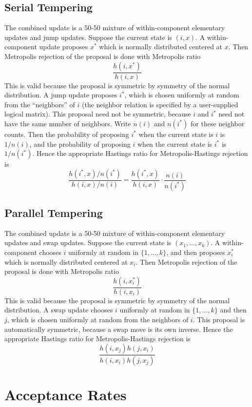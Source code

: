 \documentclass[11pt]{article}
\begin{document}
\subsection{Serial Tempering}

The combined update is a 50-50 mixture of within-component elementary updates
and jump updates.  Suppose the current state is $(i, x)$.  A within-component
update proposes $x^*$ which is normally distributed centered at $x$.  Then
Metropolis rejection of the proposal is done with Metropolis ratio
$$
   \frac{h(i, x^*)}{h(i, x)}
$$
This is valid because the proposal is symmetric by symmetry of the normal
distribution.  A jump update proposes $i^*$, which is chosen uniformly at
random from the ``neighbors'' of $i$ (the neighbor relation is specified
by a user-supplied logical matrix).  This proposal need not be symmetric,
because $i$ and $i^*$ need not have the same number of neighbors.  Write
$n(i)$ and $n(i^*)$ for these neighbor counts.  Then the probability of
proposing $i^*$ when the current state is $i$ is $1 / n(i)$, and the
probability of
proposing $i$ when the current state is $i^*$ is $1 / n(i^*)$.  Hence
the appropriate Hastings ratio for Metropolis-Hastings rejection is
$$
   \frac{h(i^*, x) / n(i^*)}{h(i, x) / n(i)}
   =
   \frac{h(i^*, x)}{h(i, x)} \cdot
   \frac{n(i)}{n(i^*)}
$$

\subsection{Parallel Tempering}

The combined update is a 50-50 mixture of within-component elementary updates
and swap updates.  Suppose the current state is $(x_1, \ldots, x_k)$.
A within-component chooses $i$ uniformly at random in $\{ 1, \ldots, k \}$,
and then proposes $x_i^*$ which is normally distributed centered at $x_i$.
Then Metropolis rejection of the proposal is done with Metropolis ratio
$$
   \frac{h(i, x_i^*)}{h(i, x_i)}
$$
This is valid because the proposal is symmetric by symmetry of the normal
distribution.  A swap update chooses $i$ uniformly at random in
$\{ 1, \ldots, k \}$ and then $j$, which is chosen uniformly at
random from the neighbors of $i$.
This proposal is automatically symmetric, because a swap move is its own
inverse.
Hence the appropriate Hastings ratio for Metropolis-Hastings rejection is
$$
   \frac{h(i, x_j) h(j, x_i)}{h(i, x_i) h(j, x_j)}
$$

\section{Acceptance Rates}
\end{document}
